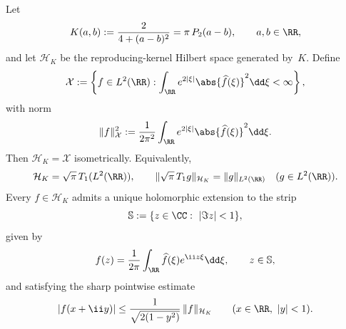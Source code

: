 \begin{proposition}%
\label{prop:gram-space-poisson-image}
Let
\[
K(a,b):=\frac{2}{4+(a-b)^2}=\pi\,P_2(a-b),
\qquad a,b\in\RR,
\]
and let $\mathcal H_K$ be the reproducing-kernel Hilbert space generated
by~$K$.  Define
\[
\mathcal X
:=
\left\{
f\in L^2(\RR):
\int_{\RR}e^{2|\xi|}\abs{\widehat f(\xi)}^2\dd\xi<\infty
\right\},
\]
with norm
\[
\|f\|_{\mathcal X}^2
:=\frac{1}{2\pi^2}\int_{\RR}e^{2|\xi|}\abs{\widehat f(\xi)}^2\dd\xi.
\]
Then $\mathcal H_K=\mathcal X$ isometrically.  Equivalently,
\[
\mathcal H_K=\sqrt{\pi}\,T_1(L^2(\RR)),
\qquad
\|\sqrt{\pi}\,T_1 g\|_{\mathcal H_K}=\|g\|_{L^2(\RR)}
\quad(g\in L^2(\RR)).
\]
Every $f\in\mathcal H_K$ admits a unique holomorphic extension to the
strip
\[
\mathbb S:=\{z\in\CC:\ |\Im z|<1\},
\]
given by
\[
f(z)=\frac{1}{2\pi}\int_{\RR}\widehat f(\xi)e^{\ii z\xi}\dd\xi,
\qquad z\in\mathbb S,
\]
and satisfying the sharp pointwise estimate
\[
|f(x+\ii y)|\le \frac{1}{\sqrt{2(1-y^2)}}\,\|f\|_{\mathcal H_K}
\qquad(x\in\RR,\ |y|<1).
\]
\end{proposition}

